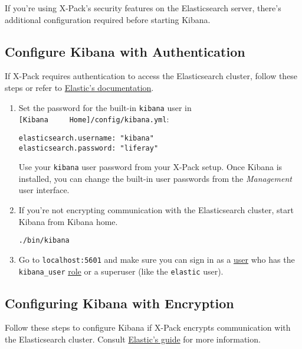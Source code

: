 If you're using X-Pack's security features on the Elasticsearch server,
there's additional configuration required before starting Kibana.

\subsection{Configure Kibana with
Authentication}\label{configure-kibana-with-authentication}

If X-Pack requires authentication to access the Elasticsearch cluster,
follow these steps or refer to
\href{https://www.elastic.co/guide/en/kibana/6.5/monitoring-xpack-kibana.html}{Elastic's
documentation}.

\begin{enumerate}
\def\labelenumi{\arabic{enumi}.}
\item
  Set the password for the built-in \texttt{kibana} user in
  \texttt{{[}Kibana\ \ \ \ \ Home{]}/config/kibana.yml}:

\begin{verbatim}
elasticsearch.username: "kibana"
elasticsearch.password: "liferay"
\end{verbatim}

  Use your \texttt{kibana} user password from your X-Pack setup. Once
  Kibana is installed, you can change the built-in user passwords from
  the \emph{Management} user interface.
\item
  If you're not encrypting communication with the Elasticsearch cluster,
  start Kibana from Kibana home.

\begin{verbatim}
./bin/kibana
\end{verbatim}
\item
  Go to \texttt{localhost:5601} and make sure you can sign in as a
  \href{https://www.elastic.co/guide/en/x-pack/6.5/native-realm.html\#native-add}{user}
  who has the \texttt{kibana\_user}
  \href{https://www.elastic.co/guide/en/x-pack/6.5/built-in-roles.html}{role}
  or a superuser (like the \texttt{elastic} user).
\end{enumerate}

\subsection{Configuring Kibana with
Encryption}\label{configuring-kibana-with-encryption}

Follow these steps to configure Kibana if X-Pack encrypts communication
with the Elasticsearch cluster. Consult
\href{https://www.elastic.co/guide/en/kibana/6.5/using-kibana-with-security.html\#using-kibana-with-security}{Elastic's
guide} for more information.

